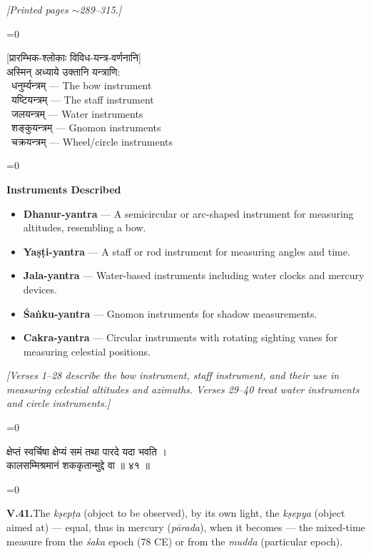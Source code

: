 \documentclass[11pt,a4paper]{article}
\newcommand{\cnote}[1]{\textcolor{notecolor}{\textit{#1}}}
\newcommand{\dev}[1]{{\devanagarifont\color{sktcolor}#1}}
\newcommand{\iast}[1]{\textit{#1}}
\newenvironment{paracol}[1]{\begingroup}{\endgroup}
\newcommand{\switchcolumn}[1][]{%
  \ifnum#1=0\relax\else\par\nobreak\vspace{0.5em}\par\nobreak\fi%
}
\begin{document}
\vspace{0.3cm}
\cnote{[Printed pages $\sim$289–315.]}
\vspace{0.5cm}

\begin{paracol}{2}
\switchcolumn[0]
\dev{%
[प्रारम्भिक-श्लोकाः विविध-यन्त्र-वर्णनानि]\\[0.2cm]
अस्मिन् अध्याये उक्तानि यन्त्राणि:\\
\textbullet\ धनुर्म्यन्त्रम् — The bow instrument\\
\textbullet\ यष्टियन्त्रम् — The staff instrument\\
\textbullet\ जलयन्त्रम् — Water instruments\\
\textbullet\ शङ्कुयन्त्रम् — Gnomon instruments\\
\textbullet\ चक्रयन्त्रम् — Wheel/circle instruments
}

\switchcolumn[1]
\textbf{Instruments Described}\\[0.2cm]
\begin{itemize}[leftmargin=*]
  \item \textbf{Dhanur-yantra} — A semicircular or arc-shaped
    instrument for measuring altitudes, resembling a bow.
  \item \textbf{Yaṣṭi-yantra} — A staff or rod instrument for
    measuring angles and time.
  \item \textbf{Jala-yantra} — Water-based instruments including
    water clocks and mercury devices.
  \item \textbf{Śaṅku-yantra} — Gnomon instruments for shadow
    measurements.
  \item \textbf{Cakra-yantra} — Circular instruments with rotating
    sighting vanes for measuring celestial positions.
\end{itemize}
\end{paracol}

\vspace{0.5cm}
\cnote{[Verses 1–28 describe the bow instrument, staff instrument, and
their use in measuring celestial altitudes and azimuths. Verses
29–40 treat water instruments and circle instruments.]}
\vspace{0.5cm}

\begin{paracol}{2}
\switchcolumn[0]
\dev{%
क्षेप्तं स्वर्चिषा क्षेप्यं समं तथा पारदे यदा भवति ।\\
कालसम्मिश्रमानं शककृतान्मुद्दे वा ॥ ४१ ॥
}

\switchcolumn[1]
\textbf{V.41.}\quad The \iast{kṣepṭa} (object to be observed), by
its own light, the \iast{kṣepya} (object aimed at) — equal, thus
in mercury (\iast{pārada}), when it becomes — the mixed-time
measure from the \iast{śaka} epoch (78 CE) or from the
\iast{mudda} (particular epoch).
\end{paracol}
\end{document}
